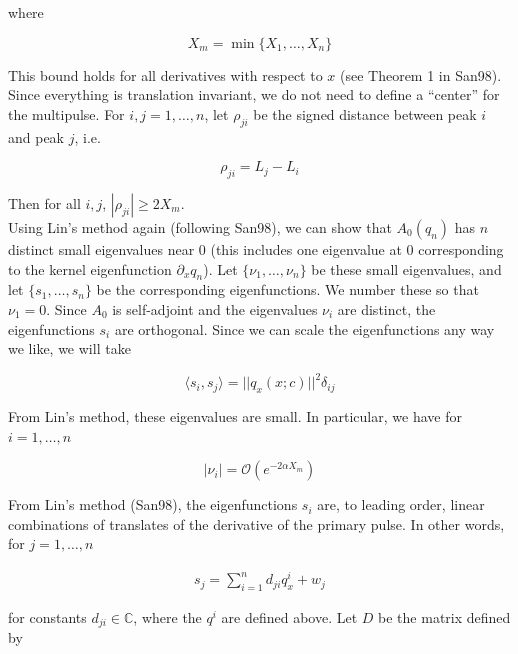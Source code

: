 \documentclass[12pt]{article}
\def\C{{\mathbb C}}
\begin{document}
where

\begin{equation}\label{defXm}
X_m = \min\{X_1, \dots, X_n \}
\end{equation}

This bound holds for all derivatives with respect to $x$ (see Theorem 1 in San98). Since everything is translation invariant, we do not need to define a ``center'' for the multipulse. For $i, j = 1, \dots, n$, let $\rho_{ji}$ be the signed distance between peak $i$ and peak $j$, i.e. 

\begin{equation}\label{rhoji}
\rho_{ji} = L_j - L_i
\end{equation}

Then for all $i, j$, $|\rho_{ji}| \geq 2 X_m$.\\

Using Lin's method again (following San98), we can show that $A_0(q_n)$ has $n$ distinct small eigenvalues near 0 (this includes one eigenvalue at 0 corresponding to the kernel eigenfunction $\partial_x q_n$). Let $\{\nu_1, \dots, \nu_n\}$ be these small eigenvalues, and let $\{s_1, \dots, s_n \}$ be the corresponding eigenfunctions. We number these so that $\nu_1 = 0$. Since $A_0$ is self-adjoint and the eigenvalues $\nu_i$ are distinct, the eigenfunctions $s_i$ are orthogonal. Since we can scale the eigenfunctions any way we like, we will take

\begin{equation}\label{orthonormaleigs}
\langle s_i, s_j \rangle = ||q_x(x; c)||^2 \delta_{ij}
\end{equation}

From Lin's method, these eigenvalues are small. In particular, we have for $i = 1, \dots, n$

\begin{equation}
|\nu_i| = \mathcal{O}(e^{-2 \alpha X_m})
\end{equation}

From Lin's method (San98), the eigenfunctions $s_i$ are, to leading order, linear combinations of translates of the derivative of the primary pulse. In other words, for $j = 1, \dots, n$

\begin{align}\label{sj}
s_j = \sum_{i = 1}^{n} d_{ji} q^i_x + w_j
\end{align}

for constants $d_{ji} \in \C$, where the $q^i$ are defined above. Let $D$ be the matrix defined by 
\end{document}
